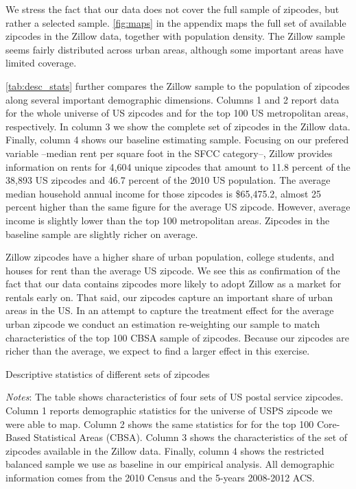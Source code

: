 We stress the fact that our data does not cover the full sample of zipcodes, but rather a
selected sample. \autoref{fig:maps} in the appendix maps the full set of available 
zipcodes in the Zillow data, together with population density. The Zillow sample seems 
fairly distributed across urban areas, although some important areas have limited coverage. 

\autoref{tab:desc_stats} further compares the Zillow sample to the population of zipcodes
along several important demographic dimensions. Columns 1 and 2 report data for the whole 
universe of US zipcodes and for the top 100 US metropolitan areas, respectively. In column 
3 we show the complete set of zipcodes in the Zillow data. Finally, column 4 shows our 
baseline estimating sample. Focusing on our prefered variable --median rent per square
foot in the SFCC category--, Zillow provides information on rents for 4,604 unique zipcodes 
that amount to 11.8 percent of the 38,893 US zipcodes and 46.7 percent of the 2010 US 
population. The average median household annual income for those zipcodes is \$65,475.2, 
almost 25 percent higher than the same figure for the average US zipcode. However, average 
income is slightly lower than the top 100 metropolitan areas. Zipcodes in the baseline 
sample are slightly richer on average. 

Zillow zipcodes have a higher share of urban population, college students, and houses for 
rent than the average US zipcode. We see this as confirmation of the fact that our data 
contains zipcodes more likely to adopt Zillow as a market for rentals early on. That said, 
our zipcodes capture an important share of urban areas in the US. In an attempt to capture 
the treatment effect for the average urban zipcode we conduct an estimation re-weighting 
our sample to match characteristics of the top 100 CBSA sample of zipcodes. Because our 
zipcodes are richer than the average, we expect to find a larger effect in this exercise.

\begin{table}[h!]
	\caption{Descriptive statistics of different sets of zipcodes}
	\centering
	\label{tab:desc_stats}    
	
	\begin{minipage}{0.95\textwidth} \footnotesize
		\vspace{3mm} 
		\textit{Notes}: The table shows characteristics of four sets of US postal service 
		zipcodes. Column 1 reports demographic statistics for the universe of USPS zipcode we 
		were able to map. Column 2 shows the same statistics for for the top 100 Core-Based 
		Statistical Areas (CBSA). Column 3 shows the characteristics of the set of zipcodes 
		available in the Zillow data. Finally, column 4 shows the restricted balanced sample 
		we use as baseline in our empirical analysis. All demographic information comes from 
		the 2010 Census and the 5-years 2008-2012 ACS.
	\end{minipage}
\end{table}

